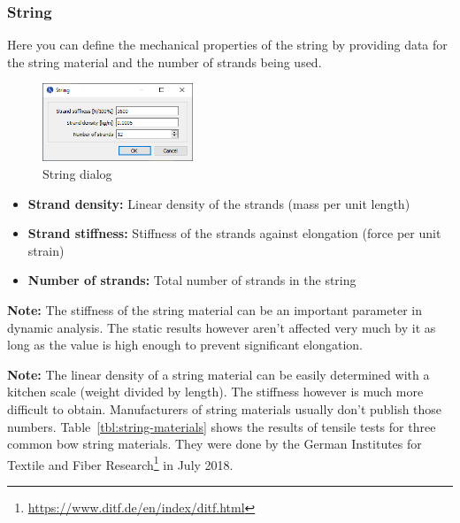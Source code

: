 \documentclass[12pt]{article}
\begin{document}
\newpage
\subsubsection{String}

Here you can define the mechanical properties of the string by providing data for the string material and the number of strands being used.

\bigskip

\begin{figure}[H]
\centering
\includegraphics[width=0.4\textwidth]{figures/screenshots/input/string}
\caption{String dialog}
\label{fig:string}
\end{figure}

\begin{itemize}
\item \textbf{Strand density:} Linear density of the strands (mass per unit length)
\item \textbf{Strand stiffness:} Stiffness of the strands against elongation (force per unit strain)
\item \textbf{Number of strands:} Total number of strands in the string
\end{itemize}

\bigskip

\textbf{Note:} The stiffness of the string material can be an important parameter in dynamic analysis.
The static results however aren't affected very much by it as long as the value is high enough to prevent significant elongation.

\textbf{Note:} The linear density of a string material can be easily determined with a kitchen scale (weight divided by length).
The stiffness however is much more difficult to obtain.
Manufacturers of string materials usually don't publish those numbers.
Table~\ref{tbl:string-materials} shows the results of tensile tests for three common bow string materials.
They were done by the German Institutes for Textile and Fiber Research\footnote{\url{https://www.ditf.de/en/index/ditf.html}} in July 2018.

\bigskip
\end{document}
